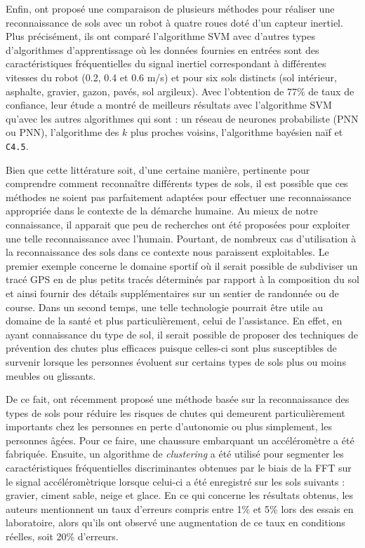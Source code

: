 Enfin, \cite{Weiss2007} ont proposé une comparaison de plusieurs méthodes pour réaliser une reconnaissance de sols avec un robot à quatre roues doté d'un capteur inertiel. Plus précisément, ils ont comparé l'algorithme \acs{SVM} avec d'autres types d'algorithmes d'apprentissage où les données fournies en entrées sont des caractéristiques fréquentielles du signal inertiel correspondant à différentes vitesses du robot (0.2, 0.4 et 0.6 m/s) et pour six sols distincts (sol intérieur, asphalte, gravier, gazon, pavés, sol argileux). Avec l'obtention de 77\% de taux de confiance, leur étude a montré de meilleurs résultats avec l'algorithme \acs{SVM} qu'avec les autres algorithmes qui sont : un réseau de neurones probabiliste (\acl{PNN} ou \acs{PNN}), l'algorithme des $k$ plus proches voisins, l'algorithme bayésien naïf et \texttt{C4.5}.

Bien que cette littérature soit, d'une certaine manière, pertinente pour comprendre comment reconnaître différents types de sols, il est possible que ces méthodes ne soient pas parfaitement adaptées pour effectuer une reconnaissance appropriée dans le contexte de la démarche humaine. Au mieux de notre connaissance, il apparait que peu de recherches ont été proposées pour exploiter une telle reconnaissance avec l'humain. Pourtant, de nombreux cas d'utilisation à la reconnaissance des sols dans ce contexte nous paraissent exploitables. Le premier exemple concerne le domaine sportif où il serait possible de subdiviser un tracé \acs{GPS} en de plus petits tracés déterminés par rapport à la composition du sol et ainsi fournir des détails supplémentaires sur un sentier de randonnée ou de course. Dans un second temps, une telle technologie pourrait être utile au domaine de la santé et plus particulièrement, celui de l'assistance. En effet, en ayant connaissance du type de sol, il serait possible de proposer des techniques de prévention des chutes plus efficaces puisque celles-ci sont plus susceptibles de survenir lorsque les personnes évoluent sur certains types de sols plus ou moins meubles ou glissants.

De ce fait, \cite{Otis2016} ont récemment proposé une méthode basée sur la reconnaissance des types de sols pour réduire les risques de chutes qui demeurent particulièrement importants chez les personnes en perte d'autonomie ou plus simplement, les personnes âgées. Pour ce faire, une chaussure embarquant un accéléromètre a été fabriquée. Ensuite, un algorithme de \textit{clustering} a été utilisé pour segmenter les caractéristiques fréquentielles discriminantes obtenues par le biais de la \acs{FFT} sur le signal accéléromètrique lorsque celui-ci a été enregistré sur les sols suivants : gravier, ciment sable, neige et glace. En ce qui concerne les résultats obtenus, les auteurs mentionnent un taux d'erreurs compris entre 1\% et 5\% lors des essais en laboratoire, alors qu’ils ont observé une augmentation de ce taux en conditions réelles, soit 20\% d'erreurs.

